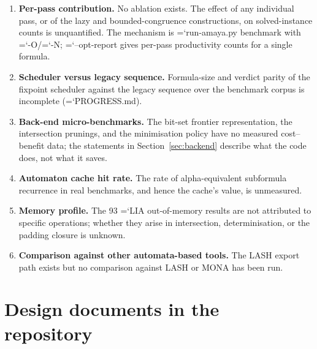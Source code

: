 \documentclass[10pt,a4paper]{article}
\newcommand{\code}[1]{{\small\ttfamily\hyphenchar\font=`\-\relax #1}}
\begin{document}
\begin{enumerate}
  \item \textbf{Per-pass contribution.}  No ablation exists.  The effect of any individual pass, or of
        the lazy and bounded-congruence constructions, on solved-instance counts is unquantified.  The
        mechanism is \code{run-amaya.py benchmark} with \code{-O}/\code{-N}; \code{--opt-report} gives
        per-pass productivity counts for a single formula.
  \item \textbf{Scheduler versus legacy sequence.}  Formula-size and verdict parity of the fixpoint
        scheduler against the legacy sequence over the benchmark corpus is incomplete
        (\code{PROGRESS.md}).
  \item \textbf{Back-end micro-benchmarks.}  The bit-set frontier representation, the intersection
        prunings, and the minimisation policy have no measured cost--benefit data; the statements in
        Section~\ref{sec:backend} describe what the code does, not what it saves.
  \item \textbf{Automaton cache hit rate.}  The rate of alpha-equivalent subformula recurrence in real
        benchmarks, and hence the cache's value, is unmeasured.
  \item \textbf{Memory profile.}  The 93 \code{LIA} out-of-memory results are not attributed to
        specific operations; whether they arise in intersection, determinisation, or the padding
        closure is unknown.
  \item \textbf{Comparison against other automata-based tools.}  The LASH export path exists but no
        comparison against LASH or MONA has been run.
\end{enumerate}

\section{Design documents in the repository}
\label{sec:docs}
\end{document}
